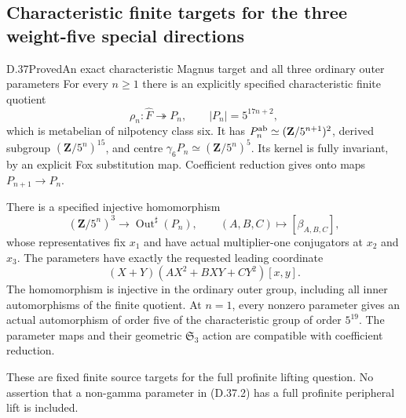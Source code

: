 \subsection{Characteristic finite targets for the three weight-five special directions}

\begin{statement}{D.37}{Proved}{An exact characteristic Magnus target and all three ordinary outer parameters}
For every \(n\geq1\) there is an explicitly specified characteristic
finite quotient
\[
 \rho_n:\widehat F\twoheadrightarrow P_n,\qquad
 |P_n|=5^{17n+2},
 \tag{D.37.1}
\]
which is metabelian of nilpotency class six.  It has
\(P_n^{\rm ab}\simeq(\mathbf Z/5^{n+1})^2\),
derived subgroup \((\mathbf Z/5^n)^{15}\), and centre
\(\gamma_6P_n\simeq(\mathbf Z/5^n)^5\).
Its kernel is fully invariant, by an explicit Fox substitution map.
Coefficient reduction gives onto maps \(P_{n+1}\to P_n\).

There is a specified injective homomorphism
\[
 (\mathbf Z/5^n)^3\longrightarrow\operatorname{Out}^{\sharp}(P_n),
 \qquad (A,B,C)\longmapsto[\beta_{A,B,C}],
 \tag{D.37.2}
\]
whose representatives fix \(x_1\) and have actual multiplier-one
conjugators at \(x_2\) and \(x_3\).
The parameters have exactly the requested leading coordinate
\[
 (X+Y)(AX^2+BXY+CY^2)[x,y].
 \tag{D.37.3}
\]
The homomorphism is injective in the ordinary outer group,
including all inner automorphisms of the finite quotient.
At \(n=1\), every nonzero parameter gives an actual automorphism
of order five of the characteristic group of order \(5^{19}\).
The parameter maps and their geometric \(\mathfrak S_3\) action
are compatible with coefficient reduction.

These are fixed finite source targets for the full profinite
lifting question.  No assertion that a non-gamma parameter in
\textup{(D.37.2)} has a full profinite peripheral lift is included.
\end{statement}

